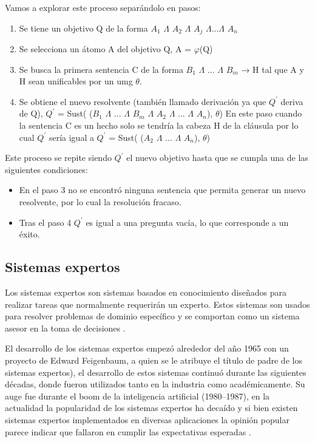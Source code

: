 \documentclass[11pt,fleqn]{book} %
\begin{document}
Vamos a explorar este proceso separándolo en pasos:

\begin{enumerate}
\item Se tiene un objetivo Q de la forma $A_1$ $\Lambda$ $A_2$ $\Lambda$ $A_j$ $\Lambda$...$\Lambda$ $A_n$
\item Se selecciona un átomo A del objetivo Q, A = $\varphi $(Q)
\item Se busca la primera sentencia C de la forma $B_1$ $\Lambda$ ... $\Lambda$ $B_m$ → H tal que A y H sean unificables por un umg $\theta$. 
\item Se obtiene el nuevo resolvente (también llamado derivación ya que $Q^{'}$ deriva de Q),  $Q^{'}$ = Sust( ($B_1$ $\Lambda$ ... $\Lambda$ $B_m$ $\Lambda$ $A_2$ $\Lambda$ ... $\Lambda$ $A_n$), $\theta$)
En este paso cuando la sentencia C es un hecho solo se tendría la cabeza H de la cláusula por lo cual $Q^{'}$ sería igual a $Q^{'}$ = Sust( ($A_2$ $\Lambda$ ... $\Lambda$ $A_n$), $\theta$)
\end{enumerate}

Este proceso se repite siendo $Q^{'}$ el nuevo objetivo hasta que se cumpla una de las siguientes condiciones:
\begin{itemize}
\item En el paso 3 no se encontró ninguna sentencia que permita generar un nuevo resolvente, por lo cual la resolución fracaso.
\item Tras el paso 4 $Q^{'}$ es igual a una pregunta vacía, lo que corresponde a un éxito.
\end{itemize}

\subsection{Sistemas expertos} 

Los sistemas expertos son sistemas basados en conocimiento diseñados para realizar tareas que normalmente requerirán un experto. Estos sistemas son usados para resolver problemas de dominio específico y se comportan como un sistema asesor en la toma de decisiones \cite{tms_ES}.

El desarrollo de los sistemas expertos empezó alrededor del año 1965 con un proyecto de Edward Feigenbaum, a quien se le atribuye el título de padre de los sistemas expertos), el desarrollo de estos sistemas continuó durante las siguientes décadas, donde fueron utilizados tanto en la industria como académicamente. Su auge fue durante el boom de la inteligencia artificial (1980–1987), en la actualidad la popularidad de los sistemas expertos ha decaído y si bien existen sistemas expertos implementados en diversas aplicaciones la opinión popular parece indicar que fallaron en cumplir las expectativas esperadas \cite{leph_ES}.
\end{document}
